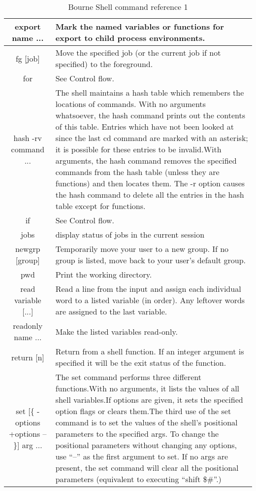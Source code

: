 \begin{table*}[H]
\begin{tabular}{|c|p{10cm}|}
		 export name ... &  Mark the named variables or functions for export to child process environments. \\ \hline
		 fg [job] &  Move the specified job (or the current job if not specified) to the foreground. \\ \hline
		 for &  See Control flow. \\ \hline
		 hash -rv command ... &  The shell maintains a hash table which remembers the locations of commands. With no arguments whatsoever, the hash command prints out the contents of this table. Entries which have not been looked at since the last cd command are marked with an asterisk; it is possible for these entries to be invalid.With arguments, the hash command removes the specified commands from the hash table (unless they are functions) and then locates them. The -r option causes the hash command to delete all the entries in the hash table except for functions. \\ \hline
		 if &  See Control flow. \\ \hline
		 jobs & display status of jobs in the current session \\ \hline
		 newgrp [group] &  Temporarily move your user to a new group. If no group is listed, move back to your user's default group. \\ \hline
		 pwd &  Print the working directory. \\ \hline
		 read variable [...] &  Read a line from the input and assign each individual word to a listed variable (in order). Any leftover words are assigned to the last variable. \\ \hline
		 readonly name ... &  Make the listed variables read-only. \\ \hline
		 return [n] &  Return from a shell function. If an integer argument is specified it will be the exit status of the function. \\ \hline
		 set [\{ -options \textbar{} +options \textbar{} -- \}] arg ... &  The set command performs three different functions.With no arguments, it lists the values of all shell variables.If options are given, it sets the specified option flags or clears them.The third use of the set command is to set the values of the shell's positional parameters to the specified args. To change the positional parameters without changing any options, use “--” as the first argument to set. If no args are present, the set command will clear all the positional parameters (equivalent to executing “shift \$\#”.) \\ \hline
	\end{tabular}
	\caption{Bourne Shell command reference 1}
	\label{tab:refcmd1} 
\end{table*}

